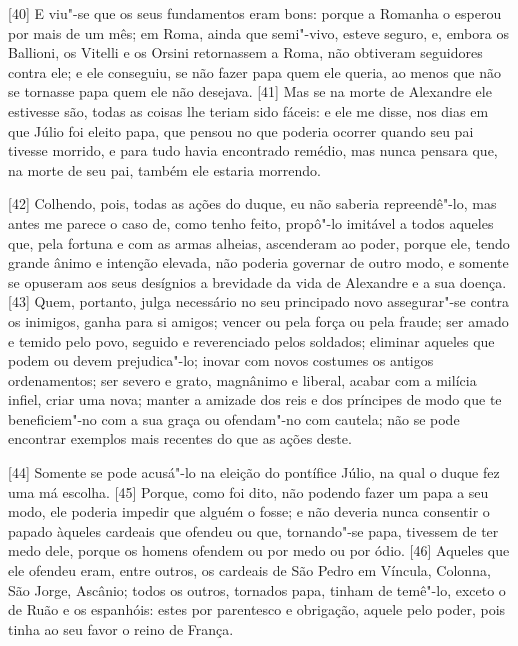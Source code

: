 {[}40{]} E viu"-se que os seus fundamentos eram bons: porque a Romanha o
esperou por mais de um mês; em Roma, ainda que semi"-vivo, esteve seguro,
e, embora os Ballioni, os Vitelli e os Orsini retornassem a Roma, não
obtiveram seguidores contra ele; e ele conseguiu, se não fazer papa quem
ele queria, ao menos que não se tornasse papa quem ele não desejava.
{[}41{]} Mas se na morte de Alexandre ele estivesse são, todas as coisas
lhe teriam sido fáceis: e ele me disse, nos dias em que Júlio  foi
eleito papa, que pensou no que poderia ocorrer quando seu pai tivesse
morrido, e para tudo havia encontrado remédio, mas nunca pensara que, na
morte de seu pai, também ele estaria morrendo.

{[}42{]} Colhendo, pois, todas as ações do duque, eu não saberia
repreendê"-lo, mas antes me parece o caso de, como tenho feito, propô"-lo
imitável a todos aqueles que, pela fortuna e com as armas alheias,
ascenderam ao poder, porque ele, tendo grande ânimo e intenção elevada,
não poderia governar de outro modo, e somente se opuseram aos seus
desígnios a brevidade da vida de Alexandre e a sua doença. {[}43{]}
Quem, portanto, julga necessário no seu principado novo assegurar"-se
contra os inimigos, ganha para si amigos; vencer ou pela força ou pela
fraude; ser amado e temido pelo povo, seguido e reverenciado pelos
soldados; eliminar aqueles que podem ou devem prejudica"-lo; inovar com
novos costumes os antigos ordenamentos; ser severo e grato, magnânimo e
liberal, acabar com a milícia infiel, criar uma nova; manter a amizade
dos reis e dos príncipes de modo que te beneficiem"-no com a sua graça ou
ofendam"-no com cautela; não se pode encontrar exemplos mais recentes do
que as ações deste.

{[}44{]} Somente se pode acusá"-lo na eleição do pontífice Júlio, na qual
o duque fez uma má escolha. {[}45{]} Porque, como foi dito, não podendo
fazer um papa a seu modo, ele poderia impedir que alguém o fosse; e não
deveria nunca consentir o papado àqueles cardeais que ofendeu ou que,
tornando"-se papa, tivessem de ter medo dele, porque os homens ofendem ou
por medo ou por ódio. {[}46{]} Aqueles que ele ofendeu eram, entre
outros, os cardeais de São Pedro em Víncula, Colonna, São Jorge, Ascânio; todos os outros, tornados
papa, tinham de temê"-lo, exceto o de Ruão e os espanhóis: estes por parentesco e obrigação,
aquele pelo poder, pois tinha ao seu favor o reino de França.


